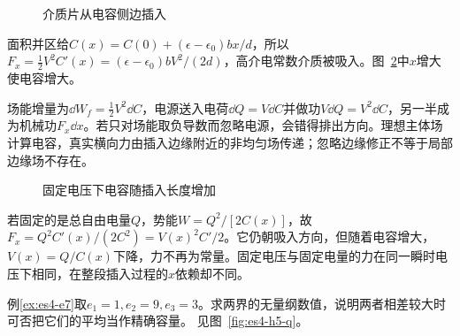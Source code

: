 \begin{figure}[H]\centering
{}
\caption{介质片从电容侧边插入}\label{fig:es4-h4-q}
\end{figure}
\begin{solution}
面积并区给$C(x)=C(0)+(\epsilon-\epsilon_0)bx/d$，所以$F_x=\tfrac12V^2C'(x)=(\epsilon-\epsilon_0)bV^2/(2d)$，高介电常数介质被吸入。图~\ref{fig:es4-h4-s}中$x$增大使电容增大。

场能增量为$\dd W_f=\tfrac12V^2\dd C$，电源送入电荷$\dd Q=V\dd C$并做功$V\dd Q=V^2\dd C$，另一半成为机械功$F_x\dd x$。若只对场能取负导数而忽略电源，会错得排出方向。理想主体场计算电容，真实横向力由插入边缘附近的非均匀场传递；忽略边缘修正不等于局部边缘场不存在。
\begin{figure}[H]\centering
{}
\caption{固定电压下电容随插入长度增加}\label{fig:es4-h4-s}
\end{figure}


若固定的是总自由电量$Q$，势能$W=Q^2/[2C(x)]$，故$F_x=Q^2C'(x)/(2C^2)=V(x)^2C'/2$。它仍朝吸入方向，但随着电容增大，$V(x)=Q/C(x)$下降，力不再为常量。固定电压与固定电量的力在同一瞬时电压下相同，在整段插入过程的$x$依赖却不同。
\end{solution}

\begin{exercise}[三介质容量界的比较]\label{ex:es4-h5}
例\ref{ex:es4-e7}取$e_1=1,e_2=9,e_3=3$。求两界的无量纲数值，说明两者相差较大时可否把它们的平均当作精确容量。 见图~\ref{fig:es4-h5-q}。
\end{exercise}

